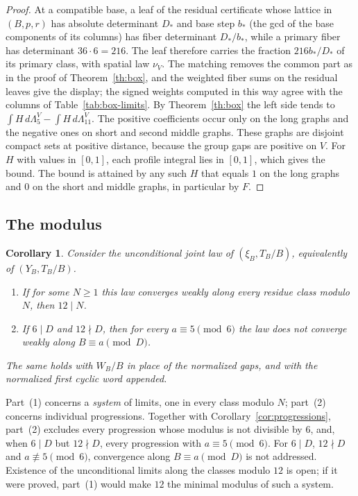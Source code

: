 \documentclass[11pt,reqno]{amsart}
\newtheorem{corollary}[theorem]{Corollary}
\theoremstyle{remark}
\begin{document}
\begin{proof}
At a compatible base, a leaf of the residual certificate whose lattice in \((B,p,r)\) has absolute determinant \(D_*\) and base step \(b_*\) (the gcd of the base components of its columns) has fiber determinant \(D_*/b_*\), while a primary fiber has determinant \(36\cdot6=216\). The leaf therefore carries the fraction \(216b_*/D_*\) of its primary class, with spatial law \(\nu_V\). The matching removes the common part as in the proof of Theorem~\ref{th:box}, and the weighted fiber sums on the residual leaves give the display; the signed weights computed in this way agree with the columns of Table~\ref{tab:box-limits}. By Theorem~\ref{th:box} the left side tends to \(\int H\,d\Lambda^V_5-\int H\,d\Lambda^V_{11}\). The positive coefficients occur only on the long graphs and the negative ones on short and second middle graphs. These graphs are disjoint compact sets at positive distance, because the group gaps are positive on \(V\). For \(H\) with values in \([0,1]\), each profile integral lies in \([0,1]\), which gives the bound. The bound is attained by any such \(H\) that equals \(1\) on the long graphs and \(0\) on the short and middle graphs, in particular by \(F\).
\end{proof}

\subsection{The modulus}

\begin{corollary}\label{cor:modulus}
Consider the unconditional joint law of \((\xi_B,T_B/B)\), equivalently of \((Y_B,T_B/B)\).
\begin{enumerate}
\item If for some \(N\ge1\) this law converges weakly along every residue class modulo~\(N\), then \(12\mid N\).
\item If \(6\mid D\) and \(12\nmid D\), then for every \(a\equiv5\pmod6\) the law does not converge weakly along \(B\equiv a\pmod D\).
\end{enumerate}
The same holds with \(W_B/B\) in place of the normalized gaps, and with the normalized first cyclic word appended.
\end{corollary}

Part~(1) concerns a \emph{system} of limits, one in every class modulo \(N\); part~(2) concerns individual progressions. Together with Corollary~\ref{cor:progressions}, part~(2) excludes every progression whose modulus is not divisible by \(6\), and, when \(6\mid D\) but \(12\nmid D\), every progression with \(a\equiv5\pmod6\). For \(6\mid D\), \(12\nmid D\) and \(a\not\equiv5\pmod6\), convergence along \(B\equiv a\pmod D\) is not addressed. Existence of the unconditional limits along the classes modulo \(12\) is open; if it were proved, part~(1) would make \(12\) the minimal modulus of such a system.
\end{document}
